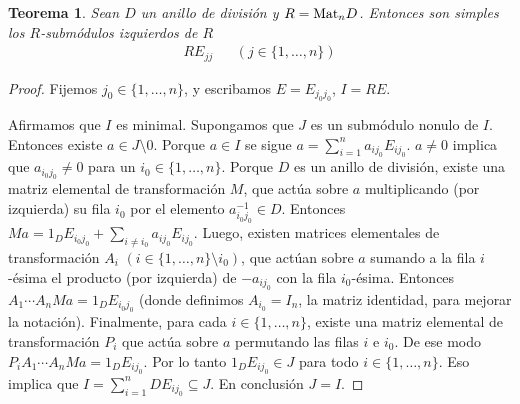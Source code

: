 \documentclass{report}
\newcommand{\Mat}{\textnormal{Mat}}
\newtheorem{theorem}{Teorema}
\begin{document}
  \begin{theorem}
    Sean \(D\) un anillo de división y \(R = \Mat_n D\).
    Entonces son simples los \(R\)-submódulos izquierdos de \(R\)
    \begin{align}
      R E_{j j}
      &&(j \in \{1, \dots, n\})
    \end{align}
  \end{theorem}
  \begin{proof}
    Fijemos \(j_0 \in \{1, \dots, n\}\), y escribamos \(E = E_{j_0 j_0}\), \(I = R E\).

    Afirmamos que \(I\) es minimal.
    Supongamos que \(J\) es un submódulo nonulo de \(I\).
    Entonces existe \(a \in J \setminus 0\).
    Porque \(a \in I\) se sigue \(a = \sum_{i = 1}^n a_{i j_0} E_{i j_0}\).
    \(a \neq 0\) implica que \(a_{i_0 j_0} \neq 0\) para un \(i_0 \in \{1, \dots, n\}\).
    Porque \(D\) es un anillo de división, existe una matriz elemental de transformación \(M\), que actúa sobre \(a\) multiplicando (por izquierda) su fila \(i_0\) por el elemento \(a_{i_0 j_0}^{- 1} \in D\).
    Entonces \(M a = 1_D E_{i_0 j_0} + \sum_{i \neq i_0} a_{i j_0} E_{i j_0}\).
    Luego, existen matrices elementales de transformación \(A_i\) \((i \in \{1, \dots, n\} \setminus i_0)\), que actúan sobre \(a\) sumando a la fila \(i\)-ésima el producto (por izquierda) de \(- a_{i j_0}\) con la fila \(i_0\)-ésima.
    Entonces \(A_1 \cdots A_n M a = 1_D E_{i_0 j_0}\) (donde definimos \(A_{i_0} = I_n\), la matriz identidad, para mejorar la notación).
    Finalmente, para cada \(i \in \{1, \dots, n\}\), existe una matriz elemental de transformación \(P_i\) que actúa sobre \(a\) permutando las filas \(i\) e \(i_0\).
    De ese modo \(P_i A_1 \cdots A_n M a = 1_D E_{i j_0}\).
    Por lo tanto \(1_D E_{i j_0} \in J\) para todo \(i \in \{1, \dots, n\}\).
    Eso implica que \(I = \sum_{i = 1}^n D E_{i j_0} \subseteq J\).
    En conclusión \(J = I\).
  \end{proof}
\end{document}
